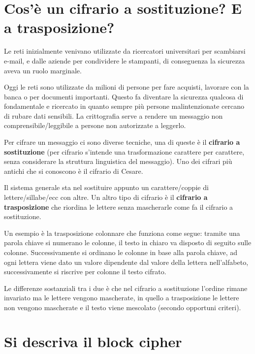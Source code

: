 \section{Cos’è un cifrario a sostituzione? E a trasposizione?}

Le reti inizialmente venivano utilizzate da ricercatori universitari per scambiarsi e-mail, e dalle aziende per condividere le stampanti, di conseguenza la sicurezza aveva un ruolo marginale.

Oggi le reti sono utilizzate da milioni di persone per fare acquisti, lavorare con la banca o per documenti importanti. Questo fa diventare la sicurezza qualcosa di fondamentale e ricercato in quanto sempre più persone malintenzionate cercano di rubare dati sensibili.
La crittografia serve a rendere un messaggio non comprensibile/leggibile a persone non autorizzate a leggerlo.

Per cifrare un messaggio ci sono diverse tecniche, una di queste è il \textbf{cifrario a sostituzione} (per cifrario s’intende una trasformazione carattere per carattere, senza considerare la struttura linguistica del messaggio). Uno dei cifrari più antichi che si conoscono è il cifrario di Cesare.

Il sistema generale sta nel sostituire appunto un carattere/coppie di lettere/sillabe/ecc con altre.
Un altro tipo di cifrario è il \textbf{cifrario a trasposizione} che riordina le lettere senza mascherarle come fa il cifrario a sostituzione.

Un esempio è la trasposizione colonnare che funziona come segue: tramite una parola chiave si numerano le colonne, il testo in chiaro va disposto di seguito sulle colonne. Successivamente si ordinano le colonne in base alla parola chiave, ad ogni lettera viene dato un valore dipendente dal valore della lettera nell’alfabeto, successivamente si riscrive per colonne il testo cifrato.

Le differenze sostanziali tra i due è che nel cifrario a sostituzione l’ordine rimane invariato ma le lettere vengono mascherate, in quello a trasposizione le lettere non vengono mascherate e il testo viene mescolato (secondo opportuni criteri).

\section{Si descriva il block cipher}

